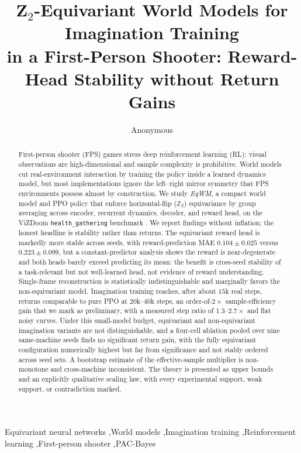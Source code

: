 \documentclass[preprint,12pt]{elsarticle}
\begin{document}
\begin{frontmatter}

\title{Z$_2$-Equivariant World Models for Imagination Training\\
in a First-Person Shooter: Reward-Head Stability without Return Gains}

\author[1]{Anonymous}
\address[1]{Anonymous Institution (double-blind review)}

\begin{abstract}
First-person shooter (FPS) games stress deep reinforcement learning (RL):
visual observations are high-dimensional and sample complexity is
prohibitive. World models cut real-environment interaction by training the
policy inside a learned dynamics model, but most implementations ignore the
left--right mirror symmetry that FPS environments possess almost by
construction. We study \emph{EqWM}, a compact world model and PPO policy that
enforce horizontal-flip ($\mathbb Z_2$) equivariance by group averaging across
encoder, recurrent dynamics, decoder, and reward head, on the ViZDoom
\texttt{health\_gathering} benchmark \cite{vizdoom2016}. We report findings
without inflation; the honest headline is stability rather than returns. The
equivariant reward head is markedly more stable across seeds, with
reward-prediction MAE $0.104\pm0.025$ versus $0.223\pm0.099$, but a
constant-predictor analysis shows the reward is near-degenerate and both
heads barely exceed predicting its mean: the benefit is cross-seed stability
of a task-relevant but not well-learned head, not evidence of reward
understanding. Single-frame reconstruction is statistically indistinguishable
and marginally favors the non-equivariant model. Imagination training reaches,
after about $15$k real steps, returns comparable to pure PPO at $20$k--$40$k
steps, an order-of-$2\times$ sample-efficiency gain that we mark as
preliminary, with a measured step ratio of $1.3$--$2.7\times$ and flat noisy
curves. Under this small-model budget, equivariant and non-equivariant
imagination variants are not distinguishable, and a four-cell ablation pooled
over nine same-machine seeds finds no significant return gain, with the fully
equivariant configuration numerically highest but far from significance and
not stably ordered across seed sets. A
bootstrap estimate of the effective-sample multiplier is non-monotone and
cross-machine inconsistent. The theory is presented as upper bounds and an
explicitly qualitative scaling law, with every experimental support, weak
support, or contradiction marked.
\end{abstract}

\begin{keyword}
Equivariant neural networks \sep World models \sep Imagination training \sep Reinforcement learning \sep First-person shooter \sep PAC-Bayes
\end{keyword}

\end{frontmatter}
\end{document}
